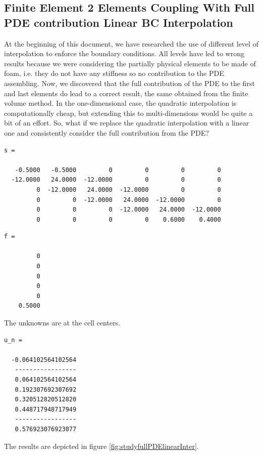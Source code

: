 \documentclass[a4paper,12pt]{article}
\begin{document}
\subsection{Finite Element 2 Elements Coupling With Full PDE contribution Linear BC Interpolation}
At the beginning of this document, we have researched the use of different level of interpolation to enforce the boundary conditions. All levels have led to wrong results because we were considering the partially physical elements to be made of foam, i.e. they do not have any stiffness so no contribution to the PDE assembling. Now, we discovered that the full contribution of the PDE to the first and last elements do lead to a correct result, the same obtained from the finite volume method. 
In the one-dimensional case, the quadratic interpolation is computationally cheap, but extending this to multi-dimensions would be quite a bit of an effort. So, what if we replace the quadratic interpolation with a linear one and consistently consider the full contribution from the PDE?
\begin{verbatim}
s =

   -0.5000   -0.5000         0         0         0         0
  -12.0000   24.0000  -12.0000         0         0         0
         0  -12.0000   24.0000  -12.0000         0         0
         0         0  -12.0000   24.0000  -12.0000         0
         0         0         0  -12.0000   24.0000  -12.0000
         0         0         0         0    0.6000    0.4000
\end{verbatim}
\begin{verbatim}
f =

         0
         0
         0
         0
         0
    0.5000
\end{verbatim}
The unknowns are at the cell centers.
\begin{verbatim}
u_n =

  -0.064102564102564
   -----------------
   0.064102564102564
   0.192307692307692
   0.320512820512820
   0.448717948717949
   -----------------
   0.576923076923077
\end{verbatim}
The results are depicted in figure \ref{fig:studyfullPDElinearInter}.
\end{document}
